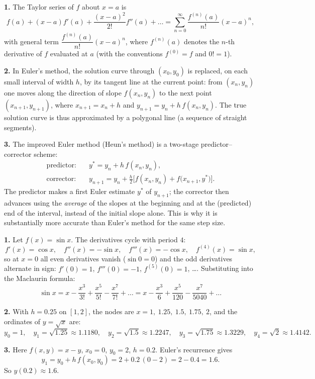\documentclass[11pt]{article}
\newcommand{\cle}[1]{{\popxbold\color{popdark}#1}}
\begin{document}
\begin{corrige}
\textbf{1.} The \cle{Taylor series} of $f$ about $x = a$ is
\[ f(a) + (x-a)f'(a) + \frac{(x-a)^2}{2!}f''(a) + \dots = \sum_{n=0}^{\infty} \frac{f^{(n)}(a)}{n!}(x-a)^n, \]
with general term $\dfrac{f^{(n)}(a)}{n!}(x-a)^n$, where $f^{(n)}(a)$ denotes the $n$-th derivative of $f$ evaluated at $a$ (with the conventions $f^{(0)} = f$ and $0! = 1$).

\textbf{2.} In \cle{Euler's method}, the solution curve through $(x_0, y_0)$ is replaced, on each small interval of width $h$, by its tangent line at the current point: from $(x_n, y_n)$ one moves along the direction of slope $f(x_n, y_n)$ to the next point $(x_{n+1}, y_{n+1})$, where $x_{n+1} = x_n + h$ and $y_{n+1} = y_n + h\,f(x_n,y_n)$. The true solution curve is thus approximated by a polygonal line (a sequence of straight segments).

\textbf{3.} The \cle{improved Euler method} (Heun's method) is a two-stage predictor--corrector scheme:
\begin{align*}
\text{predictor:}\quad & y^{*} = y_n + h\,f(x_n, y_n),\\
\text{corrector:}\quad & y_{n+1} = y_n + \frac{h}{2}\Big[f(x_n, y_n) + f\big(x_{n+1}, y^{*}\big)\Big].
\end{align*}
The predictor makes a first Euler estimate $y^{*}$ of $y_{n+1}$; the corrector then advances using the \emph{average} of the slopes at the beginning and at the (predicted) end of the interval, instead of the initial slope alone. This is why it is substantially more accurate than Euler's method for the same step size.
\end{corrige}

\begin{corrige}
\textbf{1.} Let $f(x) = \sin x$. The derivatives cycle with period $4$:
\[ f'(x) = \cos x,\quad f''(x) = -\sin x,\quad f'''(x) = -\cos x,\quad f^{(4)}(x) = \sin x, \]
so at $x = 0$ all even derivatives vanish ($\sin 0 = 0$) and the odd derivatives alternate in sign: $f'(0) = 1$, $f'''(0) = -1$, $f^{(5)}(0) = 1$, \dots. Substituting into the Maclaurin formula:
\[ \sin x = x - \frac{x^3}{3!} + \frac{x^5}{5!} - \frac{x^7}{7!} + \dots = x - \frac{x^3}{6} + \frac{x^5}{120} - \frac{x^7}{5040} + \dots \]

\textbf{2.} With $h = 0.25$ on $[1,2]$, the nodes are $x = 1,\ 1.25,\ 1.5,\ 1.75,\ 2$, and the ordinates of $y = \sqrt{x}$ are:
\[ y_0 = 1,\quad y_1 = \sqrt{1.25} \approx 1.1180,\quad y_2 = \sqrt{1.5} \approx 1.2247,\quad y_3 = \sqrt{1.75} \approx 1.3229,\quad y_4 = \sqrt{2} \approx 1.4142. \]

\textbf{3.} Here $f(x,y) = x - y$, $x_0 = 0$, $y_0 = 2$, $h = 0.2$. Euler's recurrence gives
\[ y_1 = y_0 + h\,f(x_0, y_0) = 2 + 0.2\,(0 - 2) = 2 - 0.4 = 1.6. \]
So $y(0.2) \approx 1.6$.
\end{corrige}
\end{document}
